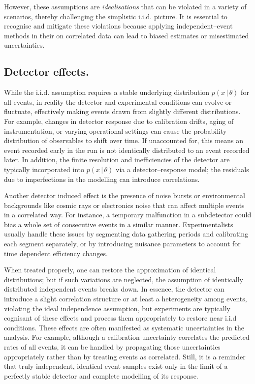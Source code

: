     However, these assumptions are \emph{idealisations} that can be violated in a variety of scenarios, thereby challenging the simplistic i.i.d. picture.
    It is essential to recognise and mitigate these violations because applying independent--event methods in their on correlated data can lead to biased estimates or misestimated uncertainties.
    \subsection{Detector effects.}
        While the i.i.d. assumption requires a stable underlying distribution $p(x\,|\,\theta)$ for all events, in reality the detector and experimental conditions can evolve or fluctuate, effectively making events drawn from slightly different distributions.
        For example, changes in detector response due to calibration drifts, aging of instrumentation, or varying operational settings can cause the probability distribution of observables to shift over time.
        If unaccounted for, this means an event recorded early in the run is not identically distributed to an event recorded later.
        In addition, the finite resolution and inefficiencies of the detector are typically incorporated into $p(x\,|\,\theta)$ via a detector--response model;
        the residuals due to imperfections in the modelling can introduce correlations.
        
        Another detector induced effect is the presence of noise bursts or environmental backgrounds like cosmic rays or electronics noise that can affect multiple events in a correlated way.
        For instance, a temporary malfunction in a subdetector could bias a whole set of consecutive events in a similar manner.
        Experimentalists usually handle these issues by segmenting data gathering periods and calibrating each segment separately, or by introducing nuisance parameters to account for time dependent efficiency changes.
        
        When treated properly, one can restore the approximation of identical distributions;
        but if such variations are neglected, the assumption of identically distributed independent events breaks down.
        In essence, the detector can introduce a slight correlation structure or at least a heterogeneity among events, violating the ideal independence assumption, but experiments are typically cognisant of these effects and process them appropriately to restore near i.i.d conditions.
        These effects are often manifested as systematic uncertainties in the analysis.
        For example, although a calibration uncertainty correlates the predicted rates of all events, it can be handled by propagating those uncertainties appropriately rather than by treating events as correlated.
        Still, it is a reminder that truly independent, identical event samples exist only in the limit of a perfectly stable detector and complete modelling of its response.
    
